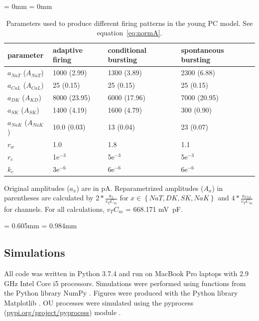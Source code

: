 \documentclass[12pt]{article}
\newcommand{\midsepremove}{\aboverulesep = 0mm \belowrulesep = 0mm}
\newcommand{\midsepdefault}{\aboverulesep = 0.605mm \belowrulesep = 0.984mm}
\begin{document}
\begin{table}[h!]
\centering
 \caption{Parameters used to produce different firing patterns in the young PC model. See equation~\eqref{eq:normA}.} 
\begin{footnotesize}
\midsepremove
\begin{tabular}{p{9em} p{9em}  p{9em}  p{9em}} %
\toprule
\textbf{parameter} & \textbf{adaptive \newline firing} & \textbf{conditional \newline bursting} & \textbf{spontaneous bursting} \\
\toprule
$a_{NaT}$ ($A_{NaT}$) & 1000 (2.99) & 1300 (3.89) & 2300 (6.88) \\
$a_{CaL}$ ($A_{CaL}$)& 25 (0.15) & 25 (0.15) & 25 (0.15) \\
$a_{DK}$ ($A_{KD}$)& 8000 (23.95) & 6000 (17.96) & 7000 (20.95) \\
$a_{SK}$ ($A_{SK}$)& 1400 (4.19) & 1600 (4.79) & 300 (0.90) \\
$a_{NaK}$ ($A_{NaK}$)& 10.0 (0.03) & 13 (0.04) & 23 (0.07) \\
$r_{w}$ & 1.0 & 1.8 & 1.1 \\
$r_{c}$ & 1e$^{-3}$ & 5e$^{-3}$ & 5e$^{-3}$ \\
$k_{c}$ & 3e$^{-6}$ & 6e$^{-6}$ & 6e$^{-6}$ \\
\bottomrule 
\end{tabular}
\vspace{0.2cm}
\begin{flushleft}
\footnotesize{Original amplitudes ($a_x$) are in pA. Reparametrized amplitudes ($A_x$) in parentheses are calculated by $2*\frac{a_x}{v_T C_m}$ for $x \in \left\{NaT,DK,SK,NaK\right\}$ and $4*\frac{a_{CaL}}{v_T C_m}$ for {\Ca} channels. For all calculations, $v_T C_m$ = 668.171 mV~pF.}
\end{flushleft}
\label{tab:regimes}
\end{footnotesize}
\end{table}
\midsepdefault

\subsection{Simulations}
All code was written in Python 3.7.4 and run on MacBook Pro laptops with 2.9 GHz Intel Core i5 processors. Simulations were performed using functions from the Python library NumPy \cite{numpyHarris2020}. Figures were produced with the Python library Matplotlib \cite{hunter2007matplotlib}. OU processes were simulated using the pyprocess (\href{https://pypi.org/project/pyprocess/}{pypi.org/project/pyprocess}) module \citep{mondaca200PyProcess}.
\end{document}

